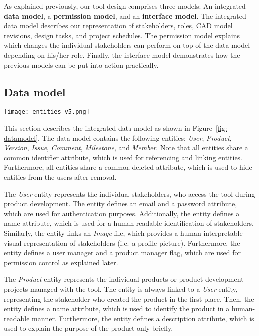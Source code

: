     As explained previously, our tool design comprises three models: An integrated \textbf{data model}, a \textbf{permission model}, and an \textbf{interface model}.
    The integrated data model describes our representation of stakeholders, roles, CAD model revisions, design tasks, and project schedules.
    The permission model explains which changes the individual stakeholders can perform on top of the data model depending on his/her role.
    Finally, the interface model demonstrates how the previous models can be put into action practically.

    \subsection*{Data model}

    \begin{figure*}[ht]
        \centering
        \texttt{[image: entities-v5.png]}
        \caption{Integrated data model for improved information exchange between customers, project managers, requirements engineers, and product designers}
        \label{fig: datamodel}
    \end{figure*}

    This section describes the integrated data model as shown in Figure~\ref{fig: datamodel}.
    The data model contains the following entities: \textit{User}, \textit{Product}, \textit{Version}, \textit{Issue}, \textit{Comment}, \textit{Milestone}, and \textit{Member}.
    Note that all entities share a common identifier attribute, which is used for referencing and linking entities.
    Furthermore, all entities share a common deleted attribute, which is used to hide entities from the users after removal.

    The \textit{User} entity represents the individual stakeholders, who access the tool during product development.
    The entity defines an email and a password attribute, which are used for authentication purposes.
    Additionally, the entity defines a name attribute, which is used for a human-readable identification of stakeholders.
    Similarly, the entity links an \textit{Image} file, which provides a human-interpretable visual representation of stakeholders (i.e.\ a profile picture).
    Furthermore, the entity defines a user manager and a product manager flag, which are used for permission control as explained later.
    
    The \textit{Product} entity represents the individual products or product development projects managed with the tool.
    The entity is always linked to a \textit{User} entity, representing the stakeholder who created the product in the first place.
    Then, the entity defines a name attribute, which is used to identify the product in a human-readable manner.
    Furthermore, the entity defines a description attribute, which is used to explain the purpose of the product only briefly.

